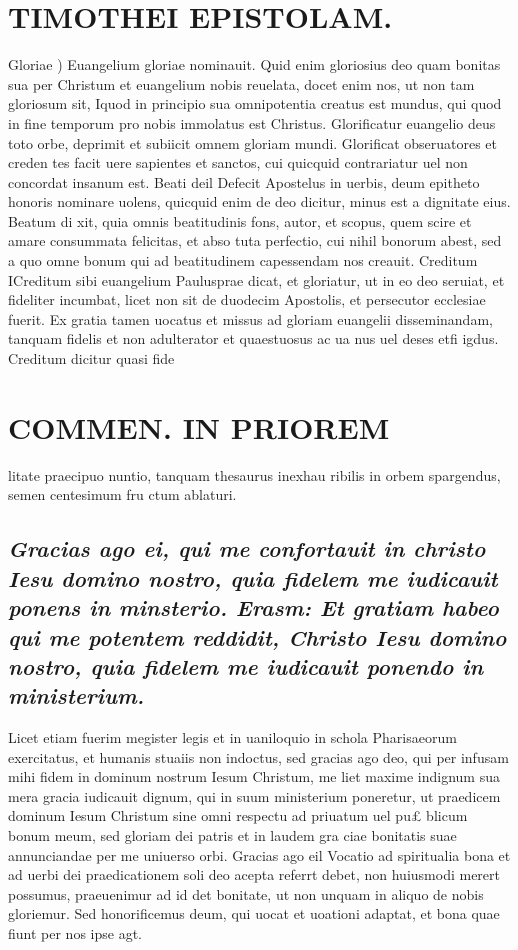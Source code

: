\documentclass{article}
\begin{document}
\begin{pages}
\section*{TIMOTHEI EPISTOLAM. }
\marginpar{[ p.23 ]}\pstart Gloriae ) Euangelium gloriae nominauit. Quid enim gloriosius deo quam bonitas sua per Christum et euangelium nobis reuelata, docet enim nos, ut non tam gloriosum sit, Iquod in principio sua omnipotentia creatus est mundus, qui quod in fine temporum pro nobis immolatus est Christus. Glorificatur euangelio deus toto orbe, deprimit et subiicit omnem gloriam mundi. Glorificat obseruatores et creden tes facit uere sapientes et sanctos, cui quicquid contrariatur uel non concordat insanum est.  \pend\pstart Beati deil Defecit Apostelus in uerbis, deum epitheto honoris nominare uolens, quicquid enim de deo dicitur, minus est a dignitate eius. Beatum di xit, quia omnis beatitudinis fons, autor, et scopus, quem scire et amare consummata felicitas, et abso tuta perfectio, cui nihil bonorum abest, sed a quo omne bonum qui ad beatitudinem capessendam nos creauit.  \pend\pstart Creditum ICreditum sibi euangelium Paulusprae dicat, et gloriatur, ut in eo deo seruiat, et fideliter incumbat, licet non sit de duodecim Apostolis, et persecutor ecclesiae fuerit. Ex gratia tamen uocatus et missus ad gloriam euangelii disseminandam, tanquam fidelis et non adulterator et quaestuosus ac ua nus uel deses etfi igdus. Creditum dicitur quasi fide  \pend
\section*{COMMEN. IN PRIOREM }
\marginpar{[ p.24 ]}\pstart litate praecipuo nuntio, tanquam thesaurus inexhau ribilis in orbem spargendus, semen centesimum fru ctum ablaturi.  \pend
{}
{}
\subsection*{\textit{Gracias ago ei, qui me confortauit in christo Iesu domino nostro, quia fidelem me iudicauit ponens in minsterio. Erasm: Et gratiam habeo qui me potentem reddidit, Christo Iesu domino nostro, quia fidelem me iudicauit ponendo in ministerium. }}\pstart Licet etiam fuerim megister legis et in uaniloquio in schola Pharisaeorum exercitatus, et humanis stuaiis non indoctus, sed gracias ago deo, qui per infusam mihi fidem in dominum nostrum Iesum Christum, me liet maxime indignum sua mera gracia iudicauit dignum, qui in suum ministerium poneretur, ut praedicem dominum Iesum Christum sine omni respectu ad priuatum uel pu£ blicum bonum meum, sed gloriam dei patris et in laudem gra ciae bonitatis suae annunciandae per me uniuerso orbi.  \pend\pstart Gracias ago eil Vocatio ad spiritualia bona et ad uerbi dei praedicationem soli deo acepta referrt debet, non huiusmodi merert possumus, praeuenimur ad id det bonitate, ut non unquam in aliquo de nobis gloriemur. Sed honorificemus deum, qui uocat et uoationi adaptat, et bona quae fiunt per nos ipse agt.  \pend

\end{pages}
\end{document}
